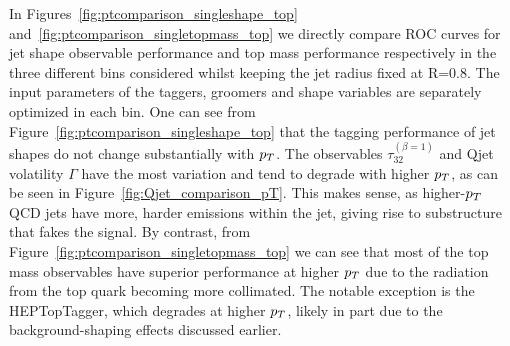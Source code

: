 In Figures~\ref{fig:ptcomparison_singleshape_top} and~\ref{fig:ptcomparison_singletopmass_top} we directly compare ROC curves for jet shape observable performance and top mass performance respectively in the three different \pt bins considered whilst keeping the jet radius fixed at R=0.8. The input parameters of the taggers, groomers and shape variables are separately optimized in each \pt bin.  One can see from Figure~\ref{fig:ptcomparison_singleshape_top} that the tagging performance of jet shapes do not change substantially with $p_T$. The observables $\tau_{32}^{(\beta=1)}$ and Qjet volatility $\Gamma$ have the most variation and tend to degrade with higher $p_T$, as can be seen in Figure~\ref{fig:Qjet_comparison_pT}. This makes sense, as higher-$p_T$ QCD jets have more, harder emissions within the jet, giving rise to substructure that fakes the signal. By contrast, from Figure~\ref{fig:ptcomparison_singletopmass_top} we can see that most of the top mass observables have superior performance at higher $p_T$ due to the radiation from the top quark becoming more collimated. The notable exception is the HEPTopTagger, which degrades at higher $p_T$, likely in part due to the background-shaping effects discussed earlier.




